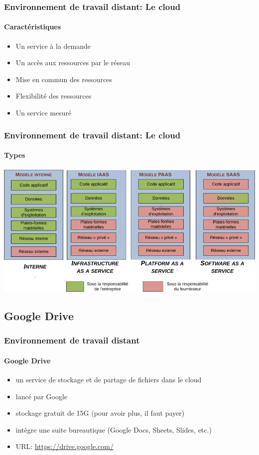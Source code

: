 \documentclass{beamer}
\begin{document}
\begin{frame}
\frametitle{Environnement de travail distant: Le cloud}
\framesubtitle{Caractéristiques}

\begin{itemize}
	\item Un service à la demande
	\item Un accès aux ressources par le réseau
	\item Mise en commun des ressources
	\item Flexibilité des ressources
	\item Un service mesuré
\end{itemize}


\end{frame}


\begin{frame}
\frametitle{Environnement de travail distant: Le cloud}
\framesubtitle{Types}

\includegraphics[width=
\textwidth]{../img/Bweb01-environnement/cloud-types.png}


\end{frame}

\subsection{Google Drive}

\begin{frame}
\frametitle{Environnement de travail distant}
\framesubtitle{Google Drive}

\begin{itemize}
	\item un service de stockage et de partage de fichiers dans le cloud
	\item lancé par Google
	\item stockage gratuit de 15G (pour avoir plus, il faut payer)
	\item intègre une suite bureautique (Google Docs, Sheets, Slides, etc.)
	\item URL: \url{https://drive.google.com/}
\end{itemize}

\end{frame}
\end{document}
